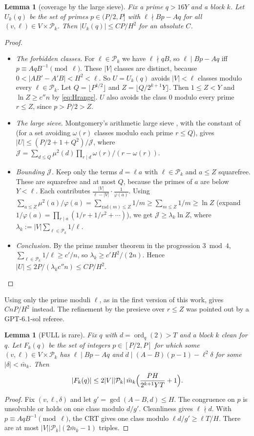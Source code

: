 \documentclass[11pt]{amsart}
\newtheorem{lemma}[theorem]{Lemma}
\theoremstyle{definition}
\newcommand{\Pk}{\mathcal{P}_k}
\newcommand{\ord}{\operatorname{ord}}
\newcommand{\mbar}{\bar m_k}
\begin{document}
\begin{lemma}[coverage by the large sieve]\label{lem:sieve}
Fix a prime $q>16Y$ and a block $k$. Let $U_k(q)$ be the set of primes $p\in(P/2,P]$ with
$\ell\nmid Bp-Aq$ for all $(v,\ell)\in V\times\Pk$. Then $|U_k(q)|\le CP/H^2$ for an absolute $C$.
\end{lemma}
\begin{proof}
\begin{itemize}
\item \emph{The forbidden classes.} For $\ell\in\Pk$ we have $\ell\nmid qB$, so $\ell\mid Bp-Aq$ iff
  $p\equiv AqB^{-1}\pmod\ell$. These $|V|$ classes are distinct, because $0<|AB'-A'B|<H^2<\ell$. So $U=U_k(q)$
  avoids $|V|<\ell$ classes modulo every $\ell\in\Pk$. Let $Q=\lfloor P^{1/2}\rfloor$ and
  $Z=\lfloor Q/2^{k+1}Y\rfloor$. Then $1\le Z<Y$ and $\ln Z\ge c''n$ by \eqref{eq:Hrange}. $U$
  also avoids the class $0$ modulo every prime $r\le Z$, since $p>P/2>Z$.
\item \emph{The large sieve.} Montgomery's arithmetic large sieve \cite{montgomery1968}, with the
  constant of \cite{mv1973} (for a set avoiding $\omega(r)$ classes modulo each prime $r\le Q$),
  gives $|U|\le(P/2+1+Q^2)/\mathcal J$, where
  $\mathcal J=\sum_{d\le Q}\mu^2(d)\prod_{r\mid d}\omega(r)/(r-\omega(r))$.
\item \emph{Bounding $\mathcal J$.} Keep only the terms $d=\ell a$ with $\ell\in\Pk$ and $a\le Z$
  squarefree. These are squarefree and at most $Q$, because the primes of $a$ are below $Y<\ell$.
  Each contributes $\frac{|V|}{\ell-|V|}\cdot\frac1{\varphi(a)}$. Using
  $\sum_{a\le Z}\mu^2(a)/\varphi(a)=\sum_{\mathrm{rad}(m)\le Z}1/m\ge\sum_{m\le Z}1/m\ge\ln Z$
  (expand $1/\varphi(a)=\prod_{r\mid a}(1/r+1/r^2+\cdots)$), we get
  $\mathcal J\ge\lambda_k\ln Z$, where $\lambda_k:=|V|\sum_{\ell\in\Pk}1/\ell$.
\item \emph{Conclusion.} By the prime number theorem in the progression $3\bmod4$,
  $\sum_{\ell\in\Pk}1/\ell\ge c'/n$, so $\lambda_k\ge c'H^2/(2n)$. Hence
  $|U|\le 2P/(\lambda_k c''n)\le CP/H^2$.
\end{itemize}
\end{proof}

Using only the prime moduli $\ell$, as in the first version of this work, gives $CnP/H^2$
instead. The refinement by the presieve over $r\le Z$ was pointed out by a GPT-6.1-sol referee.

\begin{lemma}[FULL is rare]\label{lem:crt}
Fix $q$ with $d=\ord_q(2)>T$ and a block $k$ clean for $q$. Let $F_k(q)$ be the set of integers
$p\in[P/2,P]$ for which some $(v,\ell)\in V\times\Pk$ has $\ell\mid Bp-Aq$ and
$d\mid(A-B)(p-1)-\ell^2\delta$ for some $|\delta|<\mbar$. Then
\[
  |F_k(q)|\le2|V||\Pk|\,\mbar\Bigl(\frac{PH}{2^{k+1}YT}+1\Bigr).
\]
\end{lemma}
\begin{proof}
Fix $(v,\ell,\delta)$ and let $g'=\gcd(A-B,d)\le H$. The congruence on $p$ is unsolvable or holds
on one class modulo $d/g'$. Cleanliness gives $\ell\nmid d$. With $p\equiv AqB^{-1}\pmod\ell$, the
CRT gives one class modulo $\ell d/g'\ge\ell T/H$. There are at most $|V||\Pk|(2\mbar-1)$ triples.
\end{proof}
\end{document}
